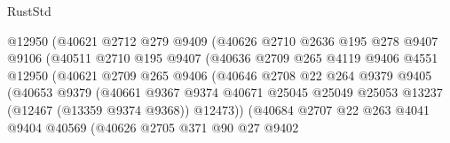 \begin{lexlean}{RustStd}
\begin{coremodule}
                            @12950
                            (@40621
                              @2712
                              @279
                              @9409
                              (@40626
                                @2710
                                @2636
                                @195
                                @278
                                @9407
                                @9106
                                (@40511
                                  @2710
                                  @195
                                  @9407
                                  (@40636
                                    @2709
                                    @265
                                    @4119
                                    @9406
                                    @4551
                                    @12950
                                    (@40621
                                      @2709
                                      @265
                                      @9406
                                      (@40646
                                        @2708
                                        @22
                                        @264
                                        @9379
                                        @9405
                                        (@40653
                                          @9379
                                          (@40661
                                            @9367
                                            @9374
                                            @40671
                                            @25045
                                            @25049
                                            @25053
                                            @13237
                                            (@12467 (@13359 @9374 @9368))
                                            @12473))
                                        (@40684
                                          @2707
                                          @22
                                          @263
                                          @4041
                                          @9404
                                          @40569
                                          (@40626
                                            @2705
                                            @371
                                            @90
                                            @27
                                            @9402

\end{coremodule}
\end{lexlean}
